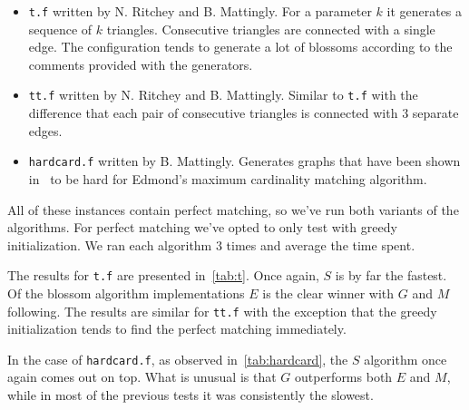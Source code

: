 \begin{itemize}
    \item \texttt{t.f} written by N. Ritchey and B. Mattingly. For a parameter $k$ it generates a sequence of $k$ triangles. Consecutive triangles are connected with a single edge. The configuration tends to generate a lot of blossoms according to the comments provided with the generators.
    \item \texttt{tt.f} written by N. Ritchey and B. Mattingly. Similar to \texttt{t.f} with the difference that each pair of consecutive triangles is connected with $3$ separate edges.
    \item \texttt{hardcard.f} written by B. Mattingly. Generates graphs that have been shown in~\cite{gabow1976efficient} to be hard for Edmond's maximum cardinality matching algorithm.
\end{itemize}

All of these instances contain perfect matching, so we've run both variants of the algorithms. For perfect matching we've opted to only test with greedy initialization. We ran each algorithm $3$ times and average the time spent.

The results for \texttt{t.f} are presented in~\ref{tab:t}. Once again, $S$ is by far the fastest. Of the blossom algorithm implementations $E$ is the clear winner with $G$ and $M$ following. The results are similar for \texttt{tt.f} with the exception that the greedy initialization tends to find the perfect matching immediately. 

In the case of \texttt{hardcard.f}, as observed in~\ref{tab:hardcard}, the $S$ algorithm once again comes out on top. What is unusual is that $G$ outperforms both $E$ and $M$, while in most of the previous tests it was consistently the slowest.

